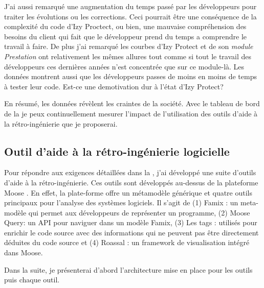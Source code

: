 \documentclass[a4paper]{article}
\begin{document}
J'ai aussi remarqué une augmentation du temps passé par les développeurs pour traiter les évolutions ou les corrections.
Ceci pourrait être une conséquence de la complexité du code d'Izy Proctect, ou bien, une mauvaise compréhension des besoins du client qui fait que le développeur prend du temps a comprendre le travail à faire.
De plus j'ai remarqué les courbes d'Izy Protect et de  son \textit{module Prestation} ont relativement les mêmes allures tout comme si tout le travail des développeurs ces dernières années n'est concentrée que sur ce module-là.  
Les données montrent aussi que les développeurs passes de moins en moins de temps à tester leur code. Est-ce une demotivation dur à l'état d'Izy Protect?

En résumé, les données révèlent les craintes de la société.
Avec le tableau de bord de la  je peux continuellement mesurer l'impact de l'utilisation des outils d'aide à la rétro-ingénierie que je proposerai.

\subsection{Outil d'aide à la rétro-ingénierie logicielle}

Pour répondre aux exigences détaillées dans la  , j'ai développé une suite d'outils d'aide à la rétro-ingénierie.
Ces outils sont développés au-dessus de la plateforme Moose \cite{Nier05c}.
En effet, la plate-forme offre un métamodèle générique et quatre outils principaux pour l'analyse des systèmes logiciels.
Il s'agit de (1) Famix : un meta-modèle qui permet aux développeurs de représenter un programme, (2) Moose Query: un API pour naviguer dans un modèle Famix,
(3) Les tags : utilisés pour enrichir le code source avec des informations qui ne peuvent pas être directement déduites du code source et 
(4) Roassal : un framework de visualisation intégré dans Moose.

Dans la suite, je présenterai d'abord l'architecture mise en place pour les outils puis chaque outil.
\end{document}
